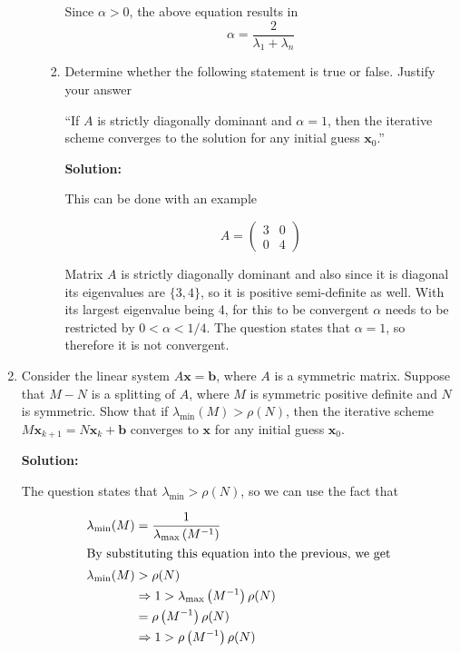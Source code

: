 \documentclass[12pt]{article}
\newcommand{\inv}[1]{ #1^{-1}}
\newcommand{\minn}{\text{min}}
\newcommand{\maxx}{\text{max}}
\renewcommand{\P}[1]{\left( #1 \right)}
\begin{document}
\begin{enumerate}
\begin{enumerate}
\begin{enumerate}
    Since $\alpha > 0$, the above equation results in
    \[
    \alpha = \frac{2}{\lambda_{1} + \lambda_{n}}
    \]
    \item Determine whether the following statement is true or false. Justify
    your answer

    ``If $A$ is strictly diagonally dominant and $\alpha = 1$, then the iterative
    scheme converges to the solution for any initial guess $\mathbf{x}_{0}$.''

    {\bf Solution:}

    This can be done with an example

    \[
        A = \begin{pmatrix}3 & 0\\0 & 4 \end{pmatrix}
    \]

    Matrix $A$ is strictly diagonally dominant and also since it is diagonal its eigenvalues
    are $\{ 3, 4\}$, so it is positive semi-definite as well. With its largest eigenvalue being 4,
    for this to be convergent $\alpha$ needs to be restricted by $0 < \alpha < 1/4$. The question
    states that $\alpha = 1$, so therefore it is not convergent.
  \end{enumerate}
\end{enumerate}

\item Consider the linear system $A\mathbf{x} = \mathbf{b}$, where $A$ is a symmetric
matrix. Suppose that $M - N$ is a splitting of $A$, where $M$ is symmetric positive
definite and $N$ is symmetric. Show that if $\lambda_{\minn}(M) > \rho(N)$, then
the iterative scheme $M\mathbf{x}_{k+1} = N\mathbf{x}_{k} + \mathbf{b}$ converges
to $\mathbf{x}$ for any initial guess $\mathbf{x}_{0}$.

{\bf Solution:}

The question states that $\lambda_{\minn} > \rho(N)$, so we can use the fact that

\begin{align}
  \lambda_{\minn}(M) &= \frac{1}{\lambda_{\maxx}\P{\inv{M}}}\nonumber\\
  \intertext{By substituting this equation into the previous, we get}
  \lambda_{\minn}(M) &> \rho(N)\nonumber\\
  &\Rightarrow 1 > \lambda_{\maxx}\P{\inv{M}}\rho(N)\nonumber\\
  &= \rho\P{\inv{M}}\rho(N)\nonumber\\
  &\Rightarrow 1 > \rho\P{\inv{M}}\rho(N)\label{eq:ineq_5}
\end{align}


\end{enumerate}
\end{document}
